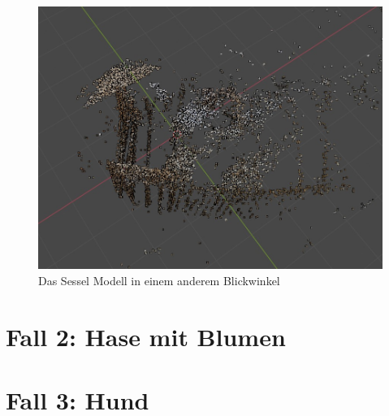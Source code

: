 \begin{figure}
    \includegraphics[width=\textwidth]{src/img/chair_model_2.jpg}
    \caption{Das Sessel Modell in einem anderem Blickwinkel}
    \label{fig:chair-model}
\end{figure}


\section{Fall 2: Hase mit Blumen}
\section{Fall 3: Hund}
